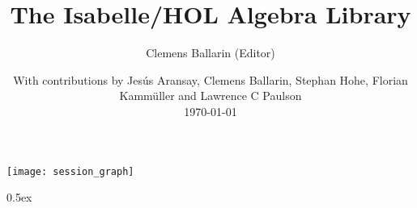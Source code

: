\documentclass[11pt,a4paper]{article}
\begin{document}
\title{The Isabelle/HOL Algebra Library}
\author{Clemens Ballarin (Editor)}
\date{With contributions by Jesús Aransay, Clemens Ballarin, Stephan Hohe,
  Florian Kammüller and Lawrence C Paulson \\
  \today}
\maketitle

\tableofcontents

\begin{center}
  \texttt{[image: session\_graph]}
\end{center}

\clearpage

\parindent 0pt\parskip 0.5ex


\pagestyle{headings}


\end{document}
